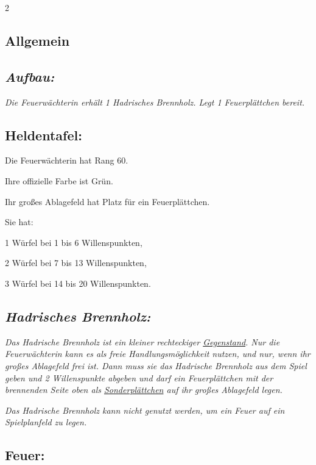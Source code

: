 \documentclass[10pt, a4paper, oneside]{book}
\newcommand{\fan}[1]{\textit{#1}}
\begin{document}
\begin{multicols*}{2}\raggedcolumns


\begin{nobgcolor}

\section{Allgemein}


\subsection{\fan{Aufbau:}}

\fan{Die Feuerwächterin erhält 1 Hadrisches Brennholz. Legt 1 Feuerplättchen bereit.}



\subsection{Heldentafel:}

Die Feuerwächterin hat Rang 60.

Ihre offizielle Farbe ist Grün.

Ihr großes Ablagefeld hat Platz für ein Feuerplättchen.

Sie hat:

\bullet{} 1 Würfel bei 1 bis 6 Willenspunkten,

\bullet{} 2 Würfel bei 7 bis 13 Willenspunkten,

\bullet{} 3 Würfel bei 14 bis 20 Willenspunkten.




\subsection{\fan{Hadrisches Brennholz:}}

\fan{Das Hadrische Brennholz ist ein kleiner rechteckiger \hyperref[Gegenstände und Sonderplättchen]{Gegenstand}. Nur die Feuerwächterin kann es als freie Handlungsmöglichkeit nutzen, und nur, wenn ihr großes Ablagefeld frei ist. Dann muss sie das Hadrische Brennholz aus dem Spiel geben und 2 Willenspunkte abgeben und darf ein Feuerplättchen mit der brennenden Seite oben als \hyperref[Gegenstände und Sonderplättchen]{\fan{Sonderplättchen}} auf ihr großes Ablagefeld legen.}

\fan{Das Hadrische Brennholz kann nicht genutzt werden, um ein Feuer auf ein Spielplanfeld zu legen.}


\subsection{Feuer:}


\end{nobgcolor}
\end{multicols*}
\end{document}
